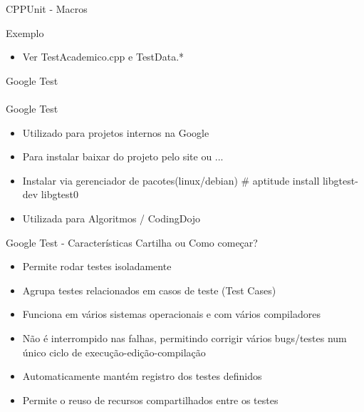 \documentclass[10pt,a4paper]{beamer}
\begin{document}
	\begin{frame}{CPPUnit - Macros}
		\begin{tiny}
			\begin{block}{}
					
			\end{block}
		\end{tiny}
	\end{frame}	

	\begin{frame}{Exemplo}
		\begin{itemize}
			\item Ver TestAcademico.cpp e TestData.*
		\end{itemize}			
	\end{frame}  

	\begin{frame}{Google Test}
		\paragraph{}
		Google Test
		\begin{itemize}
			\item Utilizado para projetos internos na Google \cite{GoogleTest:01}
			\pause
			\item Para instalar baixar do projeto pelo site \cite{GoogleDownloads:01} ou ...
			\pause
			\item Instalar via gerenciador de pacotes(linux/debian) \linebreak
			\# aptitude install libgtest-dev libgtest0
			\pause
			\item Utilizada para Algoritmos \cite{Ementarios:CABS001} / CodingDojo \cite{DojoPR:01}
		\end{itemize}
	\end{frame}  

	\begin{frame}{Google Test - Características}
		Cartilha ou Como começar? \cite{GoogleTestPrimer:01}
		\begin{itemize}
			\item Permite rodar testes isoladamente
			\pause
			\item Agrupa testes relacionados em casos de teste (Test Cases)
			\pause
			\item Funciona em vários sistemas operacionais e com vários compiladores
			\pause
			\item Não é interrompido nas falhas, permitindo corrigir vários bugs/testes num único ciclo de execução-edição-compilação
			\pause
			\item Automaticamente mantém registro dos testes definidos
			\pause
			\item Permite o reuso de recursos compartilhados entre os testes
		\end{itemize}
	\end{frame}  
\end{document}
